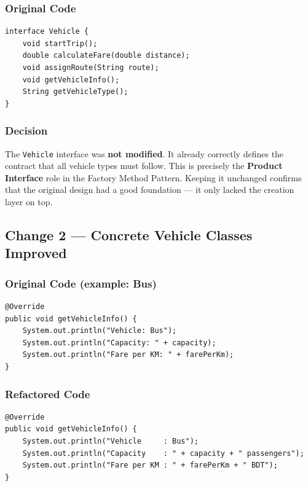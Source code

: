 \documentclass[12pt, a4paper]{article}
\begin{document}
\subsubsection{Original Code}

\begin{lstlisting}[caption={Original Vehicle interface}]
interface Vehicle {
    void startTrip();
    double calculateFare(double distance);
    void assignRoute(String route);
    void getVehicleInfo();
    String getVehicleType();
}
\end{lstlisting}

\subsubsection{Decision}

The \texttt{Vehicle} interface was \textbf{not modified}. It already correctly defines the contract that all vehicle types must follow. This is precisely the \textbf{Product Interface} role in the Factory Method Pattern. Keeping it unchanged confirms that the original design had a good foundation --- it only lacked the creation layer on top.

\subsection{Change 2 --- Concrete Vehicle Classes Improved}

\subsubsection{Original Code (example: Bus)}

\begin{lstlisting}[caption={Original Bus class --- getVehicleInfo()}]
@Override
public void getVehicleInfo() {
    System.out.println("Vehicle: Bus");
    System.out.println("Capacity: " + capacity);
    System.out.println("Fare per KM: " + farePerKm);
}
\end{lstlisting}

\subsubsection{Refactored Code}

\begin{lstlisting}[caption={Refactored Bus class --- improved output formatting}]
@Override
public void getVehicleInfo() {
    System.out.println("Vehicle     : Bus");
    System.out.println("Capacity    : " + capacity + " passengers");
    System.out.println("Fare per KM : " + farePerKm + " BDT");
}
\end{lstlisting}
\end{document}
